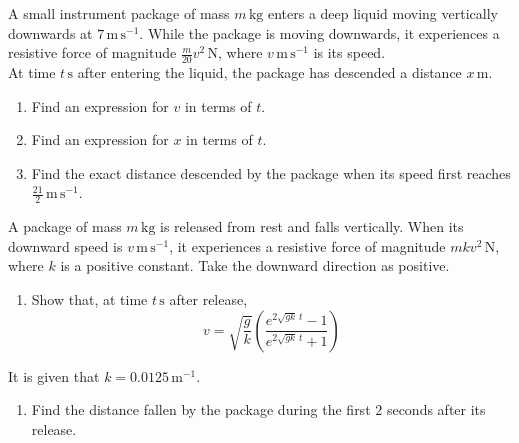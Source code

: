 \documentclass[leqno]{article}
\begin{document}
\begin{enumerate}[
  label=\textbf{\arabic*.},
  leftmargin=*,
  topsep=0pt,
  partopsep=0pt,
  parsep=0pt
]
\newpage

\questionitem

A small instrument package of mass $m\,\mathrm{kg}$ enters a deep liquid moving vertically downwards at $7\,\mathrm{m\,s^{-1}}$. While the package is moving downwards, it experiences a resistive force of magnitude $\frac{m}{20}v^2\,\mathrm{N}$, where $v\,\mathrm{m\,s^{-1}}$ is its speed. \\

At time $t\,\mathrm{s}$ after entering the liquid, the package has descended a distance $x\,\mathrm{m}$. \\

\begin{enumerate}[label=\textbf{(\alph*)}]
  \item Find an expression for $v$ in terms of $t$.  \\
  \item Find an expression for $x$ in terms of $t$.  \\
  \item Find the exact distance descended by the package when its speed first reaches $\frac{21}{2}\,\mathrm{m\,s^{-1}}$.  \\
\end{enumerate}

\newpage

\questionitem

A package of mass $m\,\mathrm{kg}$ is released from rest and falls vertically. When its downward speed is $v\,\mathrm{m\,s^{-1}}$, it experiences a resistive force of magnitude $mkv^2\,\mathrm{N}$, where $k$ is a positive constant. Take the downward direction as positive. \\

\begin{enumerate}[label=\textbf{(\alph*)}]
  \item Show that, at time $t\,\mathrm{s}$ after release,
  \[
  v=\sqrt{\frac{g}{k}}\left(\frac{e^{2\sqrt{gk}\,t}-1}{e^{2\sqrt{gk}\,t}+1}\right)
  \]
\end{enumerate}
It is given that $k=0.0125\,\mathrm{m^{-1}}$. \\
\begin{enumerate}[label=\textbf{(\alph*)}, resume]
  \item Find the distance fallen by the package during the first $2$ seconds after its release.  \\
\end{enumerate}


\end{enumerate}
\end{document}
